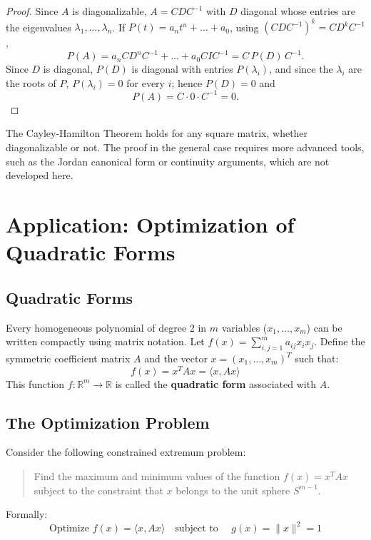 \documentclass[11pt, a4paper]{article}
\begin{document}
\begin{proof}
Since $A$ is diagonalizable, $A = C D C^{-1}$ with $D$ diagonal whose entries are the eigenvalues $\lambda_1, \dots, \lambda_n$. If $P(t) = a_n t^n + \dots + a_0$, using $(C D C^{-1})^k = C D^k C^{-1}$,
\[ P(A) = a_n C D^n C^{-1} + \dots + a_0 C I C^{-1} = C\, P(D)\, C^{-1}. \]
Since $D$ is diagonal, $P(D)$ is diagonal with entries $P(\lambda_i)$, and since the $\lambda_i$ are the roots of $P$, $P(\lambda_i) = 0$ for every $i$; hence $P(D) = 0$ and
\[ P(A) = C \cdot 0 \cdot C^{-1} = 0. \]
\end{proof}

\obs The Cayley-Hamilton Theorem holds for any square matrix, whether diagonalizable or not. The proof in the general case requires more advanced tools, such as the Jordan canonical form or continuity arguments, which are not developed here.

\newpage

\section{Application: Optimization of Quadratic Forms}

\subsection{Quadratic Forms}

Every homogeneous polynomial of degree 2 in $m$ variables ($x_1, \dots, x_m$) can be written compactly using matrix notation.
Let $f(x) = \sum_{i,j=1}^m a_{ij} x_i x_j$. Define the symmetric coefficient matrix $A$ and the vector $x = (x_1, \dots, x_m)^T$ such that:
\[ f(x) = x^T A x = \langle x, Ax \rangle \]
This function $f: \mathbb{R}^m \to \mathbb{R}$ is called the \textbf{quadratic form} associated with $A$.

\subsection{The Optimization Problem}

Consider the following constrained extremum problem:
\begin{quote}
    Find the maximum and minimum values of the function $f(x) = x^T A x$ subject to the constraint that $x$ belongs to the unit sphere $S^{m-1}$.
\end{quote}
Formally:
\[ \text{Optimize } f(x) = \langle x, Ax \rangle \quad \text{subject to } \quad g(x) = \|x\|^2 = 1 \]
\end{document}
